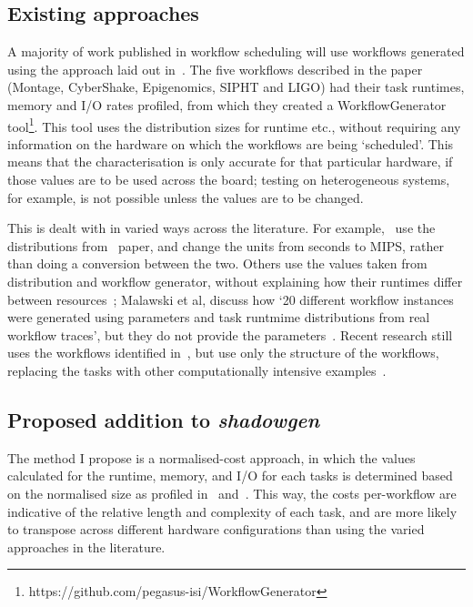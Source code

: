\documentclass[a4paper,11pt]{article}
\begin{document}
\subsection*{Existing approaches}
\label{ssec:existing}
A majority of work published in workflow scheduling will use workflows
generated using the approach laid out in~\cite{bharathi2008}. The five
workflows described in the paper (Montage, CyberShake, Epigenomics, SIPHT and
LIGO) had their task runtimes, memory and I/O rates profiled, from which they
created a WorkflowGenerator
tool\footnote{https://github.com/pegasus-isi/WorkflowGenerator}. This tool
uses the distribution sizes for runtime etc., without requiring any
information on the hardware on which the workflows are being `scheduled'. This
means that the characterisation is only accurate for that particular hardware,
if those values are to be used across the board; testing on heterogeneous
systems, for example, is not possible unless the values are to be changed.

This is dealt with in varied ways across the literature. For
example,~\cite{rodriguez2018} use the distributions
from~\cite{bharathi2008} paper, and change the units from seconds to MIPS,
rather than doing a conversion between the two. Others use the values taken
from distribution and workflow generator, without explaining how their
runtimes differ between resources~\cite{abrishami2013,malawski2015}; Malawski
et al, discuss how `20 different workflow instances were generated
using parameters and task runtmime distributions from real workflow
traces', but they do not provide the parameters~\cite{malawski2015}. Recent research still uses the workflows identified in~\cite{bharathi2008,juve2013}, but use only the structure of the workflows, replacing the tasks with other computationally intensive examples~\cite{wang2019}.

\subsection*{Proposed addition to \textit{shadowgen}} 
The method I propose is a normalised-cost approach, in which the values
calculated for the runtime, memory, and I/O for each tasks is determined based
on the normalised size as profiled in~\cite{juve2013} and~\cite{bharathi2008}.
This way, the costs per-workflow are indicative of the relative length and
complexity of each task, and are more likely to transpose across different
hardware configurations than using the varied approaches in the literature. 
\end{document}
